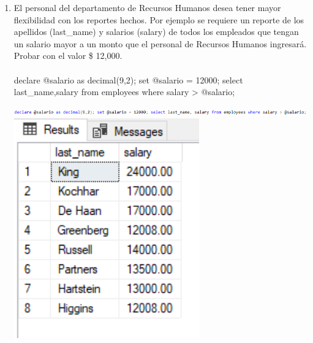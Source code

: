 \begin{enumerate}[1.]
	\item El personal del departamento de Recursos Humanos desea tener mayor flexibilidad con los reportes hechos. Por ejemplo se requiere un reporte de los apellidos (last\_name) y salarios (salary) de todos los empleados que tengan un salario mayor a un monto que el personal de Recursos Humanos ingresará. Probar con el valor \$ 12,000.
	\\ \\declare @salario as decimal(9,2); set @salario = 12000; select last\_name,salary from employees where salary > @salario;

	\begin{center}
	\includegraphics[width=17cm]{./Imagenes/actividad_04_10a} 
	\includegraphics[width=8cm]{./Imagenes/actividad_04_10} 
	\end{center}


\end{enumerate}
